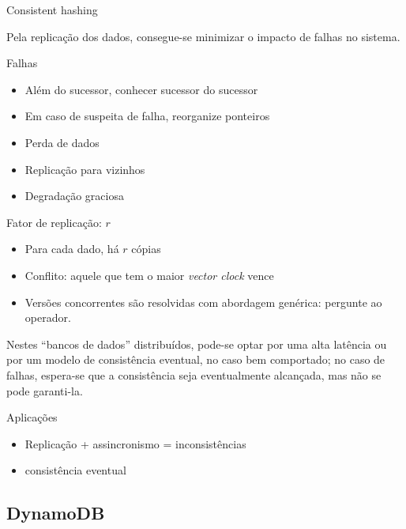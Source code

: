 \begin{frame}
Consistent hashing
\end{frame}



Pela replicação dos dados, consegue-se minimizar o impacto de falhas no sistema. 
\begin{frame}{Falhas}
\begin{itemize}
	\item Além do sucessor, conhecer sucessor do sucessor
	\item Em caso de suspeita de falha, reorganize ponteiros
	\item Perda de dados
	\pause
	\item Replicação para vizinhos
	\item Degradação graciosa
\end{itemize}
\end{frame}

\begin{frame}{Fator de replicação: $r$}
\begin{itemize}
	\item Para cada dado, há $r$ cópias
	\item Conflito: aquele que tem o maior \emph{vector clock} vence
	\item Versões concorrentes são resolvidas com abordagem genérica: pergunte ao operador.
\end{itemize}
\end{frame}





Nestes ``bancos de dados'' distribuídos, pode-se optar por uma alta latência ou por um modelo de consistência eventual, no caso bem comportado; no caso de falhas, espera-se que a consistência seja eventualmente alcançada, mas não se pode garanti-la.
\begin{frame}{Aplicações}
\begin{itemize}
\item Replicação + assincronismo = inconsistências
\item consistência eventual 
\end{itemize}
\end{frame}

\subsection{DynamoDB}

